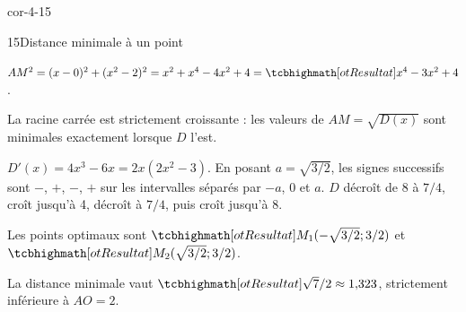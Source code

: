 \begin{blocLivre}{cor-4-15}
\begin{corrige}{15}{Distance minimale à un point}
\begin{questions}
\item $AM^2=(x-0)^2+(x^2-2)^2=x^2+x^4-4x^2+4
=\res{x^4-3x^2+4}$.
\item La racine carrée est strictement croissante : les valeurs de $AM=\sqrt{D(x)}$
sont minimales exactement lorsque $D$ l'est.
\item $D'(x)=4x^3-6x=2x(2x^2-3)$.
En posant $a=\sqrt{3/2}$, les signes successifs sont $-$, $+$, $-$, $+$
sur les intervalles séparés par $-a$, 0 et $a$.
$D$ décroît de 8 à $7/4$, croît jusqu'à 4, décroît à $7/4$, puis croît jusqu'à 8.
\item Les points optimaux sont $\res{M_1(-\sqrt{3/2};3/2)}$ et
$\res{M_2(\sqrt{3/2};3/2)}$.
\item La distance minimale vaut $\res{\sqrt7/2\approx1{,}323}$,
strictement inférieure à $AO=2$.
\end{questions}
\label{figlivre-r04-15-var-cor}

\label{figlivre-r04-15-distance-cor}

\end{corrige}
\end{blocLivre}
